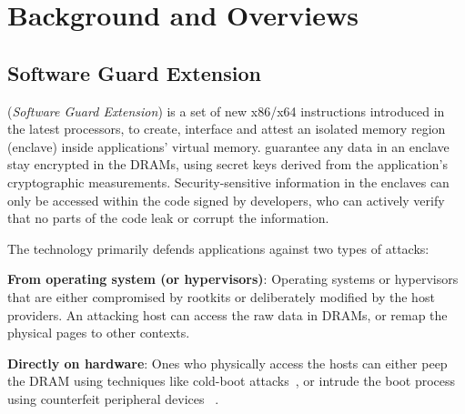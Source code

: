 \section{Background and Overviews}
\label{sec:gsgx:background}

\subsection{Software Guard Extension}
\label{sec:gsgx:background:sgx}


\sgx{} ({\it Software Guard Extension})
is a set of new x86/x64 instructions
introduced in the latest \intel{} \skylake{} processors,
to create, interface and attest
an isolated memory region (enclave) inside applications' virtual memory.
\sgx{} guarantee any data in an enclave
stay encrypted in the DRAMs, using secret keys derived from
the application's cryptographic measurements.
Security-sensitive information in the enclaves
can only be accessed within the code signed by developers,
who can actively verify that no parts of the code
leak or corrupt the information.

The technology primarily defends applications against two types of attacks:

\begin{compactitem}

\item {\bf From operating system (or hypervisors)}:
Operating systems or hypervisors
that are either compromised by rootkits
or deliberately modified by the host providers.
An attacking host can access the raw data in DRAMs, or remap the
physical pages to other contexts.

\item {\bf Directly on hardware}:
Ones who physically access the hosts can either peep
the DRAM using techniques like cold-boot attacks~\citep{halderman09coldboot},
or intrude the boot process using counterfeit peripheral devices
~\citep{hudson15thunderstrike}.

\end{compactitem}


